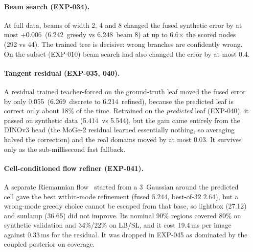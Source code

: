 \paragraph{Beam search (EXP-034).}
At full data, beams of width 2, 4 and 8 changed the fused synthetic error by at most +0.006\appDdeg\ (6.242\appDdeg\ greedy vs 6.248\appDdeg\ beam 8) at up to 6.6$\times$ the scored nodes (292 vs 44). The trained tree is decisive: wrong branches are confidently wrong. On the subset (EXP-010) beam search had also changed the error by at most 0.4\appDdeg.

\paragraph{Tangent residual (EXP-035, 040).}
A residual trained teacher-forced on the ground-truth leaf moved the fused error by only 0.055\appDdeg\ (6.269\appDdeg\ discrete to 6.214\appDdeg\ refined), because the predicted leaf is correct only about 18\% of the time. Retrained on the \emph{predicted} leaf (EXP-040), it passed on synthetic data (5.414\appDdeg\ vs 5.544\appDdeg), but the gain came entirely from the DINOv3 head (the MoGe-2 residual learned essentially nothing, so averaging halved the correction) and the real domains moved by at most 0.03\appDdeg. It survives only as the sub-millisecond fast fallback.

\paragraph{Cell-conditioned flow refiner (EXP-041).}
A separate Riemannian flow~\cite{chen2024rfm} started from a 3\appDdeg\ Gaussian around the predicted cell gave the best within-mode refinement (fused 5.244\appDdeg, best-of-32 2.64\appDdeg), but a wrong-mode greedy choice cannot be escaped from that base, so lightbox (27.12\appDdeg) and sunlamp (36.65\appDdeg) did not improve. Its nominal 90\% regions covered 80\% on synthetic validation and 34\%/22\% on LB/SL, and it cost 19.4\,ms per image against 0.33\,ms for the residual. It was dropped in EXP-045 as dominated by the coupled posterior on coverage.

